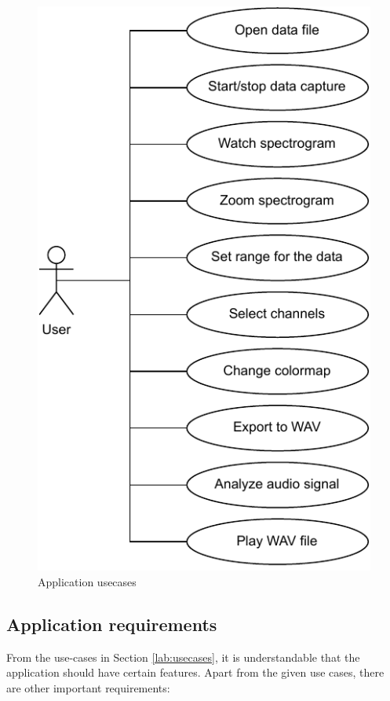 \begin{figure}[h]
    \centering
    \includegraphics{pdf/usecase.drawio.pdf}
    \caption{Application usecases}
    \label{fig:usecase}
\end{figure}

\subsection{Application requirements}\label{txt.design.sw.requirements}

From the use-cases in Section \ref{lab:usecases}, it is understandable that the application should have certain features. Apart from the given use cases, there are other important requirements:

